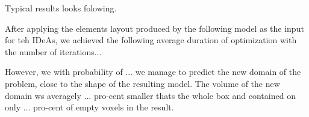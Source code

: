 Typical results looks folowing.

After applying the elements layout produced by the following model as the input for teh IDeAs, we achieved the following average duration of optimization with the number of iterations...

However, we with probability of ... we manage to predict the new domain of the problem, close to the shape of the resulting model. 
The volume of the  new domain ws averagely ... pro-cent smaller thats the whole box and contained on only ... pro-cent of empty voxels in the result.
 


